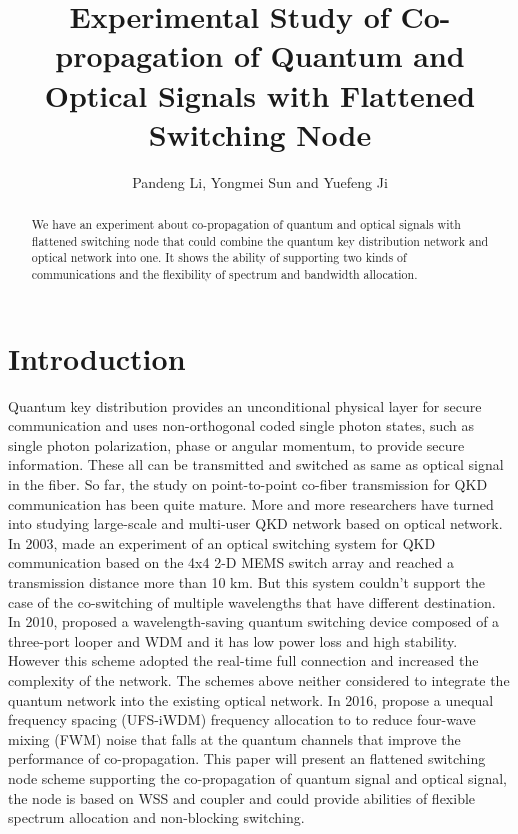 \documentclass[letterpaper,10pt]{article}
\begin{document}
\title{Experimental Study of Co-propagation of Quantum and Optical Signals with Flattened Switching Node}
\author{Pandeng Li, Yongmei Sun and Yuefeng Ji}
\address{State Key Laboratory of Information Photonics and Optical Communications, School of Information and Telecommunication Engineering, BUPT Beijing, China, 100876}

\begin{abstract}
We have an experiment about co-propagation of quantum and optical signals with flattened switching node that could combine the quantum key distribution network and optical network into one. It shows the ability of supporting two kinds of communications and the flexibility of spectrum and bandwidth allocation.
\end{abstract}

\section{Introduction}

Quantum key distribution provides an unconditional physical layer for secure communication and uses non-orthogonal coded single photon states, such as single photon polarization, phase or angular momentum, to provide secure information. These all can be transmitted and switched as same as optical signal in the fiber. So far, the study on point-to-point co-fiber transmission for QKD communication has been quite mature. More and more researchers have turned into studying large-scale and multi-user QKD network based on optical network. In 2003, \cite{ToliverPaul} made an experiment of an optical switching system for QKD communication based on the 4x4 2-D MEMS switch array and reached a transmission distance more than 10 km. But this system couldn't support the case of the co-switching of multiple wavelengths that have different destination. In 2010, \cite{WangShuang} proposed a wavelength-saving quantum switching device composed of a three-port looper and WDM and it has low power loss and high stability.  However this scheme adopted the real-time full connection and increased the complexity of the network. The schemes above neither considered to integrate the quantum network into the existing optical network. In 2016, \cite{YongmeiSun} propose a unequal frequency spacing (UFS-iWDM) frequency allocation to to reduce four-wave mixing (FWM) noise that falls at the quantum  channels that improve the performance of co-propagation. This paper will present an flattened switching node scheme supporting the co-propagation of quantum signal and optical signal, the node is based on WSS and coupler and could provide abilities of flexible spectrum allocation and non-blocking switching.
\end{document}
